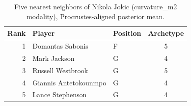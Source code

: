 \begin{table}[htbp]
  \centering\small
  \begin{tabular}{rllc}
    \toprule
    Rank & Player & Position & Archetype \\
    \midrule
    1 & Domantas Sabonis & F & 5 \\
    2 & Mark Jackson & G & 4 \\
    3 & Russell Westbrook & G & 5 \\
    4 & Giannis Antetokounmpo & G & 4 \\
    5 & Lance Stephenson & G & 4 \\
    \bottomrule
  \end{tabular}
  \caption{Five nearest neighbors of Nikola Jokic (curvature_m2 modality), Procrustes-aligned posterior mean.}
  \label{tab:Nikola_Jokic_neighbors_curvature_m2}
\end{table}

